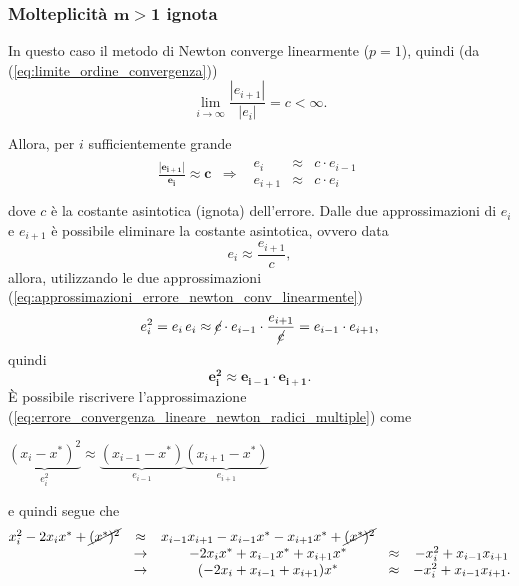 \subsubsection{Molteplicità \texorpdfstring{$\boldsymbol{m>1}$}{m>1} ignota}
In questo caso il metodo di Newton converge linearmente ($p=1$), quindi (da (\ref{eq:limite_ordine_convergenza}))
\begin{equation*}
	\underset{i\to\infty}{\lim}{\frac{|e_{i+1}|}{|e_i|}} = c<\infty.
\end{equation*}

Allora, per $i$ sufficientemente grande
\begin{equation}\label{eq:approssimazioni_errore_newton_conv_linearmente}
	\begin{matrix}
		\boldsymbol{\frac{|e_{i+1}|}{e_i}\approx c}&\Rightarrow&
		\begin{matrix}
			e_i &\approx& c\cdot e_{i-1}\\
			e_{i+1}&\approx& c\cdot e_i
		\end{matrix}\\
	\end{matrix}
\end{equation}
dove $c$ è la costante asintotica (ignota) dell'errore. Dalle due approssimazioni di $e_i$ e $e_{i+1}$ è possibile eliminare la costante asintotica, ovvero data
\begin{equation*}
	e_i \approx \frac{e_{i+1}}{c},
\end{equation*}
allora, utilizzando le due approssimazioni (\ref{eq:approssimazioni_errore_newton_conv_linearmente})
\begin{equation*}
	e_i^2=e_i\,e_i \approx\cancel{c}\cdot e_{i-1}\cdot \frac{e_{i+1}}{\cancel{c}} = e_{i-1}\cdot e_{i+1},
\end{equation*}
quindi
\begin{equation}\label{eq:errore_convergenza_lineare_newton_radici_multiple}
	\boldsymbol{e_i^2 \approx e_{i-1}\cdot e_{i+1}}.
\end{equation}
È possibile riscrivere l'approssimazione (\ref{eq:errore_convergenza_lineare_newton_radici_multiple}) come
\begin{center}
	$\underbrace{(x_i-x^*)^2}_{\text{$e_i^2$}}\approx\underbrace{(x_{i-1}-x^*)}_{\text{$e_{i-1}$}}\underbrace{(x_{i+1}-x^*)}_{\text{$e_{i+1}$}}$ 
\end{center}
e quindi segue che
\begin{equation*}
	\begin{matrix}
		x_i^2-2x_i x^*+\cancel{(x^*)^2}&\approx& x_{i-1} x_{i+1}-x_{i-1} x^* - x_{i+1} x^*+\cancel{(x^*)^2}\\
		&\rightarrow&-2x_i x^*+x_{i-1} x^*+x_{i+1}x^*&\approx&-x_i^2+x_{i-1} x_{i+1}\\
		&\rightarrow&(-2x_i+x_{i-1}+x_{i+1})x^* &\approx& -x_i^2+x_{i-1} x_{i+1}.
	\end{matrix}
\end{equation*}

